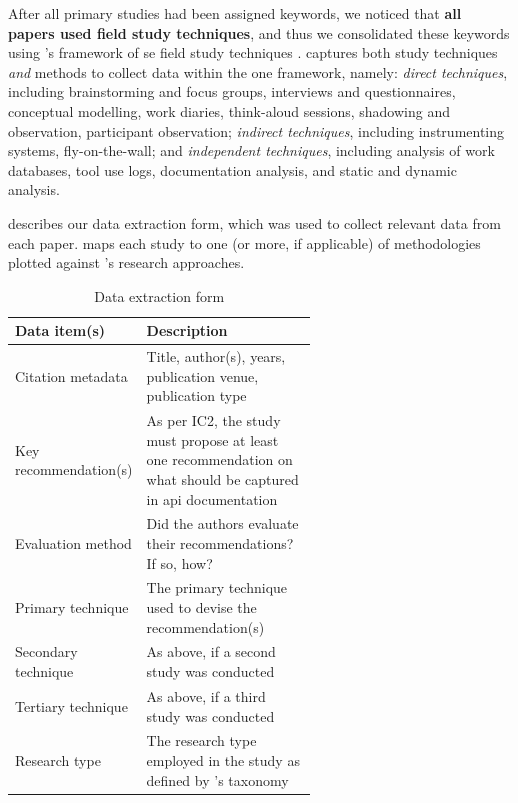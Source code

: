 After all primary studies had been assigned keywords, we noticed that \textbf{all papers used field study techniques}, and thus we consolidated these keywords using \citeauthor{Singer:2007tu}'s framework of \gls{se} field study techniques \citep{Singer:2007tu}. \citeauthor{Singer:2007tu} captures both study techniques \textit{and} methods to collect data within the one framework, namely: \textit{direct techniques}, including brainstorming and focus groups, interviews and questionnaires, conceptual modelling, work diaries, think-aloud sessions, shadowing and observation, participant observation; \textit{indirect techniques}, including instrumenting systems, fly-on-the-wall; and \textit{independent techniques}, including analysis of work databases, tool use logs, documentation analysis, and static and dynamic analysis. 

 describes our data extraction form, which was used to collect relevant data from each paper.  maps each study to one (or more, if applicable) of methodologies plotted against \citeauthor{Wieringa:2006vd}'s research approaches.

\begin{table}[tb]
  \caption[Data extraction in API documentation knowledge study]{Data extraction form}
  \label{esem2019:tab:extraction}
  \centering
  \begin{tabular}{l|p{0.6\linewidth}}
    \toprule
    \textbf{Data item(s)} &
    \textbf{Description}
    \\
    \midrule
    Citation metadata & Title, author(s), years, publication venue, publication type \\
    Key recommendation(s) & As per IC2, the study must propose at least one recommendation on what should be captured in \gls{api} documentation \\
    Evaluation method & Did the authors evaluate their recommendations? If so, how? \\
    Primary technique & The primary technique used to devise the recommendation(s) \\ 
    Secondary technique & As above, if a second study was conducted \\
    Tertiary technique & As above, if a third study was conducted \\
    Research type & The research type employed in the study as defined by \citeauthor{Wieringa:2006vd}'s taxonomy \\
    \bottomrule
  \end{tabular}
\end{table}

